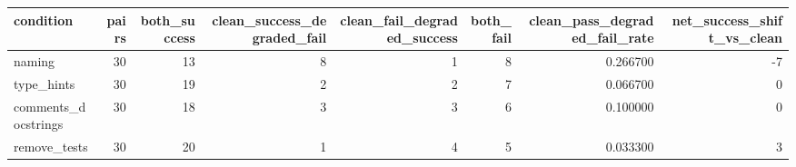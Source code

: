 \begin{tabular}{lrrrrrrr}
\toprule
condition & pairs & both\_success & clean\_success\_degraded\_fail & clean\_fail\_degraded\_success & both\_fail & clean\_pass\_degraded\_fail\_rate & net\_success\_shift\_vs\_clean \\
\midrule
naming & 30 & 13 & 8 & 1 & 8 & 0.266700 & -7 \\
type\_hints & 30 & 19 & 2 & 2 & 7 & 0.066700 & 0 \\
comments\_docstrings & 30 & 18 & 3 & 3 & 6 & 0.100000 & 0 \\
remove\_tests & 30 & 20 & 1 & 4 & 5 & 0.033300 & 3 \\
\bottomrule
\end{tabular}
